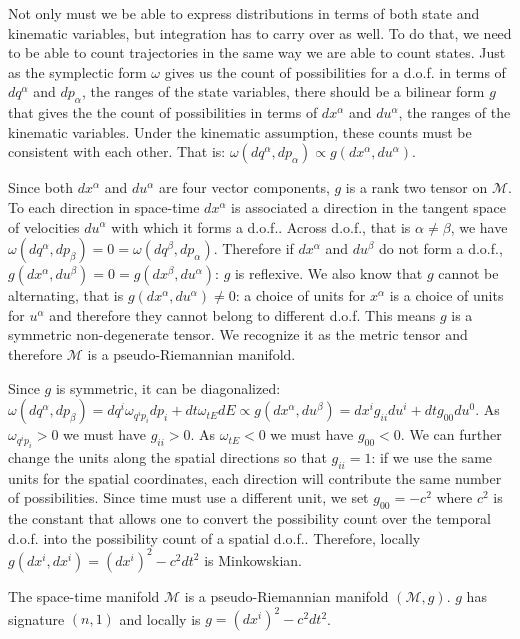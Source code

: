 \documentclass[smallextended]{svjour3}
\numberwithin{equation}{section}
\begin{document}
Not only must we be able to express distributions in terms of both state and kinematic variables, but integration has to carry over as well. To do that, we need to be able to count trajectories in the same way we are able to count states. Just as the symplectic form $\omega$ gives us the count of possibilities for a d.o.f. in terms of $dq^\alpha$ and $dp_\alpha$, the ranges of the state variables, there should be a bilinear form $g$ that gives the the count of possibilities in terms of $dx^\alpha$ and $du^\alpha$, the ranges of the kinematic variables. Under the kinematic assumption, these counts must be consistent with each other. That is: $\omega(dq^\alpha,dp_\alpha) \propto g(dx^\alpha,du^\alpha)$.

Since both $dx^\alpha$ and $du^\alpha$ are four vector components, $g$ is a rank two tensor on $\mathcal{M}$. To each direction in space-time $dx^\alpha$ is associated a direction in the tangent space of velocities $du^\alpha$ with which it forms a d.o.f.. Across d.o.f., that is $\alpha \neq \beta$, we have $\omega(dq^\alpha, dp_\beta) = 0 =\omega(dq^\beta, dp_\alpha)$. Therefore if $dx^\alpha$ and $du^\beta$ do not form a d.o.f., $g(dx^\alpha, du^\beta) = 0 = g(dx^\beta, du^\alpha)$: $g$ is reflexive. We also know that $g$ cannot be alternating, that is $g(dx^\alpha, du^\alpha) \neq 0$: a choice of units for $x^\alpha$ is a choice of units for $u^\alpha$ and therefore they cannot belong to different d.o.f. This means $g$ is a symmetric non-degenerate tensor. We recognize it as the metric tensor and therefore $\mathcal{M}$ is a pseudo-Riemannian manifold.

Since $g$ is symmetric, it can be diagonalized: $\omega(dq^\alpha, dp_\beta)= dq^i \omega_{q^ip_i} dp_i + dt \omega_{tE} dE \propto g(dx^\alpha, du^\beta) = dx^i g_{ii} du^i + dt g_{00} du^0$. As $\omega_{q^ip_i} > 0$ we must have $g_{ii} > 0$. As $\omega_{tE} < 0$ we must have $g_{00} < 0$. We can further change the units along the spatial directions so that $g_{ii}=1$: if we use the same units for the spatial coordinates, each direction will contribute the same number of possibilities. Since time must use a different unit, we set $g_{00}=-c^2$ where $c^2$ is the constant that allows one to convert the possibility count over the temporal d.o.f. into the possibility count of a spatial d.o.f.. Therefore, locally $g(dx^i, dx^i) = (dx^i)^2 - c^2 dt^2$ is Minkowskian.

\begin{prop}\label{prop:riemannian_manifold}
	The space-time manifold $\mathcal{M}$ is a pseudo-Riemannian manifold $(\mathcal{M}, g)$. $g$ has signature $(n,1)$ and locally is $g = (dx^i)^2 - c^2 dt^2$.
\end{prop}
\end{document}
